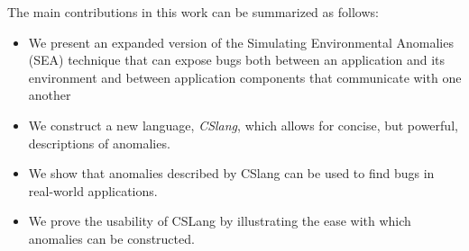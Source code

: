 
The main contributions in this work can be summarized as follows:

\begin{itemize}

\item{We present an expanded version of the Simulating Environmental
  Anomalies (SEA) technique that can expose bugs both between an
    application and its environment and between application components that
    communicate with one another}

\item{We construct a new language, {\em CSlang},
  which allows for concise, but powerful, descriptions of anomalies.}

\item{We show that anomalies described by CSlang can be used to find bugs
  in real-world applications.}

\item{We prove the usability of CSLang by illustrating the ease with which
  anomalies can be constructed.}

\end{itemize}


